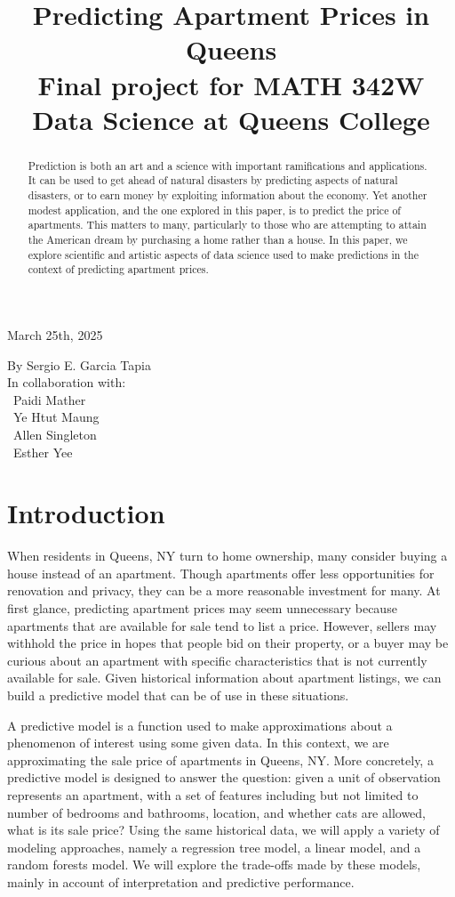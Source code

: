 \documentclass[11pt]{article}
\title{Predicting Apartment Prices in Queens\\
	\vspace{8pt}
	\normalsize Final project for MATH 342W Data Science at Queens College\\
}
\date{}
\begin{document}
	\maketitle
	\begin{center}
		March 25th, 2025
	\end{center}
	\begin{flushright}
		By Sergio E. Garcia Tapia\\
		In collaboration with:\\
		~Paidi Mather~\\
		~Ye Htut Maung~\\
		~Allen Singleton~\\
		~Esther Yee~\\
	\end{flushright}
	\begin{abstract}
		Prediction is both an art and a science with important ramifications
		and applications. It can be used to get ahead of natural disasters
		by predicting aspects of natural disasters, or to earn money by
		exploiting information about the economy. Yet another modest application,
		and the one explored in this paper, is to predict the price of apartments.
		This matters to many, particularly to those who are attempting to attain
		the American dream by purchasing a home rather than a house. In
		this paper, we explore scientific and artistic aspects of data science
		used to make predictions in the context of predicting apartment prices.
	\end{abstract}
	\pagebreak
	\section{Introduction}
	When residents in Queens, NY turn to home ownership, many consider buying
	a house instead of an apartment. Though apartments offer less opportunities
	for renovation and privacy, they can be a more reasonable investment for
	many. At first glance, predicting apartment prices may seem unnecessary
	because apartments that are available for sale tend to list a price.
	However, sellers may withhold the price in hopes that people bid on their
	property, or a buyer may be curious about an apartment with specific
	characteristics that is not currently available for sale. Given historical
	information about apartment listings, we can build a predictive model
	that can be of use in these situations.
	
	A predictive model is a function used to make approximations about
	a phenomenon of interest using some given data. In this context,
	we are approximating the sale price of apartments in Queens, NY.
	More concretely, a predictive model is designed to answer the question:
	given a unit of observation represents an apartment, with a set of
	features including but not limited to number of bedrooms and bathrooms,
	location, and whether cats are allowed, what is its sale price?
	Using the same historical data, we will apply a variety of modeling approaches,
	namely a regression tree model, a linear model, and a random forests model.
	We will explore the trade-offs made by these models, mainly in account of
	interpretation and predictive performance.
\end{document}
